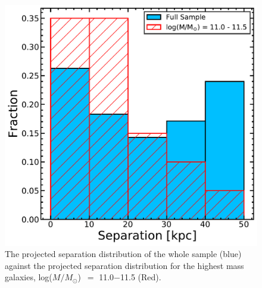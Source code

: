 \documentclass[iop,revtex4,twocolumn,apj,numberedappendix,appendixfloats]{emulateapj}
\newcommand{\logm}{log($M/M_{\odot}$)}
\begin{document}
\begin{figure}
\centering
\includegraphics[width=\linewidth]{fig/sep_hist.pdf}
\caption[]{The projected separation distribution of the whole sample (blue) against the projected separation distribution for the highest mass galaxies, \logm\ $=$ 11.0$-$11.5 (Red). }
\label{fig:sep_hist}
\end{figure}
\end{document}

